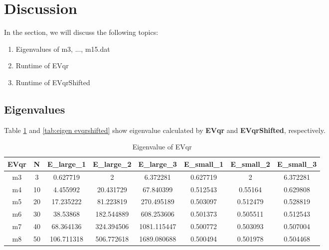 \documentclass{article}
\begin{document}
\section{Discussion}
In the section, we will discuss the following topics:
\begin{enumerate}
    \item Eigenvalues of m3, ..., m15.dat
    \item Runtime of EVqr
    \item Runtime of EVqrShifted
\end{enumerate}

\subsection{Eigenvalues}
Table \ref{tab:eigen evqr} and \ref{tab:eigen evqrshifted} show eigenvalue calculated by \textbf{EVqr} and \textbf{EVqrShifted}, respectively.
\begin{table}[H]
    \begin{center}
        \begin{tabular}{|c|c|c|c|c|c|c|c|}
            \hline
            EVqr & N & E\_large\_1 & E\_large\_2 & E\_large\_3 & E\_small\_1 & E\_small\_2 & E\_small\_3 \\ \hline
            m3 & 3 & 0.627719 & 2 & 6.372281 & 0.627719 & 2 & 6.372281 \\ \hline
            m4 & 10 & 4.455992 & 20.431729 & 67.840399 & 0.512543 & 0.55164 & 0.629808 \\ \hline
            m5 & 20 & 17.235222 & 81.223819 & 270.495189 & 0.503097 & 0.512479 & 0.528819 \\ \hline
            m6 & 30 & 38.53868 & 182.544889 & 608.253606 & 0.501373 & 0.505511 & 0.512543 \\ \hline
            m7 & 40 & 68.364136 & 324.394506 & 1081.115447 & 0.500772 & 0.503093 & 0.507004 \\ \hline
            m8 & 50 & 106.711318 & 506.772618 & 1689.080688 & 0.500494 & 0.501978 & 0.504468 \\ \hline
        \end{tabular}
    \end{center}
    \caption{Eigenvalue of EVqr}
    \label{tab:eigen evqr}
\end{table}
\end{document}
